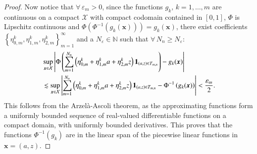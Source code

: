 \begin{proof}
Now notice that $\forall \, \varepsilon_m >0$, since the functions $g_k, \, k=1,\ldots,m$ are continuous on a compact $\mathcal{X}$ with compact codomain contained in $[0,1]$, $\Phi$ is Lipschitz continuous and $\Phi(\Phi^{-1}(g_k(\boldsymbol{x}))) = g_k(\boldsymbol{x})$, there exist coefficients $\left\{{ } \eta_{0,m}^k, { } \eta_{1, m}^k, { } \eta_{2, m}^k\right\}_{m=1}^{\infty}$ and a $N_{\varepsilon} \in \mathbb{N}$ such that $\forall \, N_n \geq N_{\varepsilon}$:
\begin{align}\label{eq: approx g_k}
    &\sup_{\boldsymbol{x} \in \mathcal{X}} \left| \Phi \left( \sum_{m=1}^{N_n}\left({ }\eta_{0, m}^k+{ }\eta_{1, m}^k a+{ }\eta_{2, m}^k z\right) \mathbf{1}_{(a, z) \in T_{m, n}} \right) - g_k(\boldsymbol{x}) \right| \\
    & \lesssim \sup_{\boldsymbol{x} \in \mathcal{X}} \left|  \sum_{m=1}^{N_n}\left({ }\eta_{0, m}^k+{ }\eta_{1, m}^k a+{ }\eta_{2, m}^k z  \right)  \mathbf{1}_{(a, z) \in T_{m, n}}- \Phi^{-1} \left(g_k(\boldsymbol{x}) \right)\right| < \frac{\varepsilon_m}{2}.
\end{align}
This follows from the Arzel\`{a}-Ascoli theorem, as the approximating functions form a uniformly bounded sequence of real-valued differentiable functions on a compact domain, with uniformly bounded derivatives. This proves that the functions $\Phi^{-1}(g_k)$ are in the linear span of the piecewise linear functions in $\boldsymbol{x}=(a,z)$.


\end{proof}
